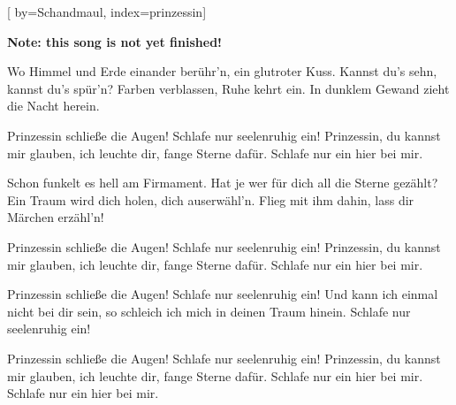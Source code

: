 

[%
    by={Schandmaul},
    index={prinzessin}]


    \label{prinzessin}

    \textbf{Note: this song is not yet finished!}

    \beginverse\memorize[verse]
        Wo Himmel und Erde einander berühr'n, ein glutroter Kuss.
        Kannst du's sehn, kannst du's spür'n?
        Farben verblassen, Ruhe kehrt ein.
        In dunklem Gewand zieht die Nacht herein.
    \endverse

    \beginchorus\memorize[chorus]
        Prinzessin schließe die Augen!
        Schlafe nur seelenruhig ein!
        Prinzessin, du kannst mir glauben, ich leuchte dir,
        fange Sterne dafür.
        Schlafe nur ein hier bei mir.
    \endchorus

    \beginverse\replay[verse]
        Schon funkelt es hell am Firmament.
        Hat je wer für dich all die Sterne gezählt?
        Ein Traum wird dich holen, dich auserwähl'n.
        Flieg mit ihm dahin, lass dir Märchen erzähl'n!
    \endverse

    \beginchorus\replay[chorus]
        Prinzessin schließe die Augen!
        Schlafe nur seelenruhig ein!
        Prinzessin, du kannst mir glauben, ich leuchte dir,
        fange Sterne dafür.
        Schlafe nur ein hier bei mir.
    \endchorus

    \beginchorus\replay[chorus]
        Prinzessin schließe die Augen!
        Schlafe nur seelenruhig ein!
        Und kann ich einmal nicht bei dir sein,
        so schleich ich mich in deinen Traum hinein.
        Schlafe nur seelenruhig ein!
    \endchorus

    \beginchorus\replay[chorus]
        Prinzessin schließe die Augen!
        Schlafe nur seelenruhig ein!
        Prinzessin, du kannst mir glauben, ich leuchte dir,
        fange Sterne dafür.
        Schlafe nur ein hier bei mir.
        Schlafe nur ein hier bei mir. 
    \endchorus
\endsong
